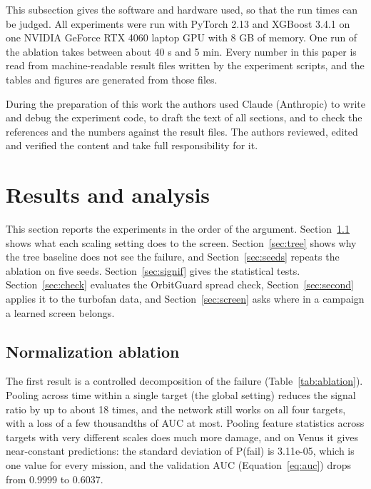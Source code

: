 This subsection gives the software and hardware used, so that the run times can be judged. All experiments were run with PyTorch 2.13 and XGBoost 3.4.1 on one NVIDIA GeForce RTX 4060 laptop GPU with 8 GB of memory. One run of the ablation takes between about 40 s and 5 min. Every number in this paper is read from machine-readable result files written by the experiment scripts, and the tables and figures are generated from those files.

During the preparation of this work the authors used Claude (Anthropic) to write and debug the experiment code, to draft the text of all sections, and to check the references and the numbers against the result files. The authors reviewed, edited and verified the content and take full responsibility for it.

\section{Results and analysis}
\label{sec:results}

This section reports the experiments in the order of the argument. Section~\ref{sec:ablation} shows what each scaling setting does to the screen. Section~\ref{sec:tree} shows why the tree baseline does not see the failure, and Section~\ref{sec:seeds} repeats the ablation on five seeds. Section~\ref{sec:signif} gives the statistical tests. Section~\ref{sec:check} evaluates the OrbitGuard spread check, Section~\ref{sec:second} applies it to the turbofan data, and Section~\ref{sec:screen} asks where in a campaign a learned screen belongs.

\subsection{Normalization ablation}
\label{sec:ablation}

The first result is a controlled decomposition of the failure (Table~\ref{tab:ablation}). Pooling across time within a single target (the global setting) reduces the signal ratio by up to about 18 times, and the network still works on all four targets, with a loss of a few thousandths of AUC at most. Pooling feature statistics across targets with very different scales does much more damage, and on Venus it gives near-constant predictions: the standard deviation of P(fail) is 3.11e-05, which is one value for every mission, and the validation AUC (Equation~\ref{eq:auc}) drops from 0.9999 to 0.6037.


